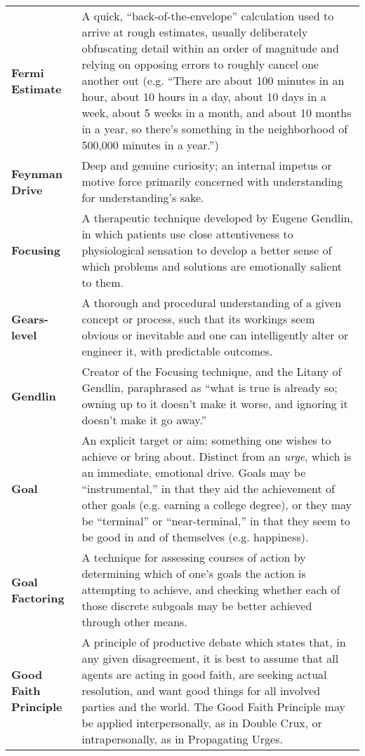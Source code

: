 \begin{longtable} { p{} p{} }
\textbf{Fermi Estimate} & A quick, ``back-of-the-envelope'' calculation used to arrive at rough estimates, usually deliberately obfuscating detail within an order of magnitude and relying on opposing errors to roughly cancel one another out (e.g. ``There are about 100 minutes in an hour, about 10 hours in a day, about 10 days in a week, about 5 weeks in a month, and about 10 months in a year, so there's something in the neighborhood of 500,000 minutes in a year.'')\\

\textbf{Feynman Drive} & Deep and genuine curiosity; an internal impetus or motive force primarily concerned with understanding for understanding's sake.\\

\textbf{Focusing} & A therapeutic technique developed by Eugene Gendlin, in which patients use close attentiveness to physiological sensation to develop a better sense of which problems and solutions are emotionally salient to them.\\

\textbf{Gears-level} & A thorough and procedural understanding of a given concept or process, such that its workings seem obvious or inevitable and one can intelligently alter or engineer it, with predictable outcomes. \\

\textbf{Gendlin} & Creator of the Focusing technique, and the Litany of Gendlin, paraphrased as ``what is true is already so; owning up to it doesn't make it worse, and ignoring it doesn't make it go away.''\\

\textbf{Goal} & An explicit target or aim; something one wishes to achieve or bring about.  Distinct from an \emph{urge}, which is an immediate, emotional drive.  Goals may be ``instrumental,'' in that they aid the achievement of other goals (e.g. earning a college degree), or they may be ``terminal'' or ``near-terminal,'' in that they seem to be good in and of themselves (e.g. happiness).\\

\textbf{Goal Factoring} & A technique for assessing courses of action by determining which of one's goals the action is attempting to achieve, and checking whether each of those discrete subgoals may be better achieved through other means.\\

\textbf{Good Faith Principle} & A principle of productive debate which states that, in any given disagreement, it is best to assume that all agents are acting in good faith, are seeking actual resolution, and want good things for all involved parties and the world.  The Good Faith Principle may be applied interpersonally, as in Double Crux, or intrapersonally, as in Propagating Urges.\\


\end{longtable}

